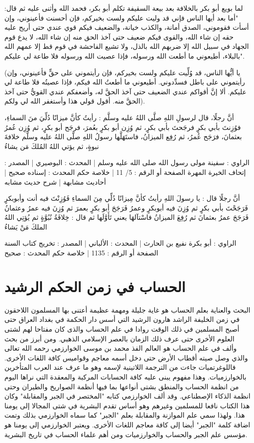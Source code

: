 لما بويع أبو بكر بالخلافة بعد بيعة السقيفة تكلم أبو بكر، فحمد الله وأثنى عليه ثم قال:
"أما بعد أيها الناس فإني قد وليت عليكم ولست بخيركم، فإن أحسنت فأعينوني، وإن أسأت فقوموني، الصدق أمانة، والكذب خيانة، والضعيف فيكم قوي عندي حتى أريح عليه حقه إن شاء الله، والقوى فيكم ضعيف حتى آخذ الحق منه إن شاء الله، لا يدع قوم الجهاد في سبيل الله إلا ضربهم الله بالذل، ولا تشيع الفاحشة في قوم قط إلا عمهم الله بالبلاء، أطيعوني ما أطعت الله ورسوله، فإذا عصيت الله ورسوله فلا طاعة لي عليكم".

(يا أيُّها الناس، قد وُلِّيت عليكم ولست بخيركم، فإن رأيتموني على حقٍّ فأعينوني، وإن رأيتموني على باطل فسدِّدوني. أطيعوني ما أطعتُ الله فيكم، فإذا عصيتُه فلا طاعة لي عليكم. ألا إنَّ أقواكم عندي الضعيف حتى آخذ الحقَّ له، وأضعفكم عندي القويُّ حتى آخذ الحقَّ منه. أقول قولي هذا وأستغفر الله لي ولكم).

أنَّ رجلًا، قال لرسولِ اللهِ صلَّى اللهُ عليه وسلَّم : رأيتُ كأنَّ ميزانًا دُلِّيَ منَ السماءِ، فوُزِنتَ بأبي بكرٍ فرجَحتَ بأبي بكرٍ، ثم وُزِن أبو بكرٍ بعُمرَ، فرجَح أبو بكرٍ، ثم وُزِن عُمرُ بعثمانَ، فرَجَح عُمرُ، ثم رُفِع الميزانُ، فاستَهَلَّها رسولُ اللهِ صلَّى اللهُ عليه وسلَّم خلافةَ نبوةٍ، ثم يؤتي اللهُ المُلكَ مَن يشاءُ

الراوي : سفينة مولى رسول الله صلى الله عليه وسلم | المحدث : البوصيري | المصدر : إتحاف الخيرة المهرة
الصفحة أو الرقم : 5/ 11 | خلاصة حكم المحدث : إسناده صحيح | أحاديث مشابهة | شرح حديث مشابه

أنَّ رجلًا قال : يا رسولَ اللهِ رأيتُ كأنَّ مِيزانًا دُلِّي مِنَ السماءِ فَوُزِنْتَ فيه أنت وأبوبكرٍ فَرَجَحْتَ بأبي بكرٍ ثم وُزِنَ فيه أبوبكرٍ وعمرُ فَرَجَحَ أبو بكرٍ بعمرَ ثم وُزِنَ فيه عمرُ وعثمانُ فَرَجَحَ عمرُ بعثمانَ ثم رُفِعَ الميزانُ فاسْتآلهَا يعني تَأَوَّلَها ثم قال : خِلافَةُ نُبُوَّةٍ ثم يُؤتِي اللهُ الملكَ مَنْ يَشاءُ

الراوي : أبو بكرة نفيع بن الحارث | المحدث : الألباني | المصدر : تخريج كتاب السنة
الصفحة أو الرقم : 1135 | خلاصة حكم المحدث : صحيح 

\section{الحساب في زمن الحكم الرشيد}
البحث والعناية بعلم الحساب هو غاية جليلة ومهمة عظيمة أعتنى بها المسلمون اللاحقون في زمن الخليفة الراشد هارون الرشيد التي أسس دار الحكمة في بغداد العراق حتى أصبح المسلمين في ذلك الوقت روادا في علم الحساب والذى كان مفتاحا لهم لشتى العلوم الأخرى حتى عرف ذلك الزمان بالعصر الإسلامي الذهبي. ومن أبرز من بحث وألف في علم الحساب هو العالم الفذ محمد بن موسى الخوارزمي رحمه الله تعالى والذي وصل صيته أقطاب الأرض حتى دخل أسمه معاجم وقواميس كافة اللغات الأخرى. فاللوغرتميات جاءت من الترجمة اللاتينية لإسمه وهو ما عرف عند العرب المتأخرين بالخوارزميات. وهذا مفهوم يبنى عليه كافة الحسابات المركبة والمعقدة التي نراها اليوم من انظمة الحساب والمنطق بشتى أنواعها بما فيها أنظمة الصواريخ والطيران وحتى انظمة الذكاء الإصطناعي. وقد ألف الخوارزمي كتابه "المختصر في الجبر والمقابلة" وكان هذا الكتاب نافعا للمسلمين وغيرهم وهو أساس تقدم البشرية في شتى المجالا إلى يومنا هذا. ولهذا سمي علم الموازنة والمقابلة بعلم "الجبر" كما سماه الخوارزمي بذلك وتمت اضافة كلمة "الجبر" أيضا إلى كافة معاجم اللغات الأخرى. ويعتبر الخوارزمي إلى يومنا هو مؤسس علم الجبر والحساب والخوارزميات ومن أهم علماء الحساب في تاريخ البشرية.

